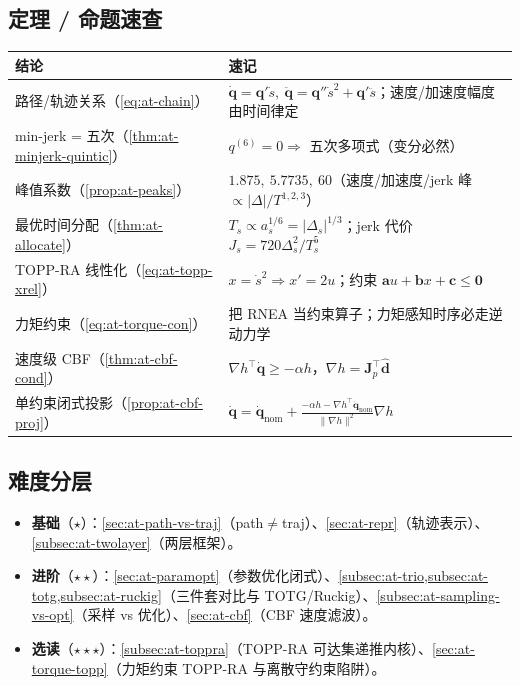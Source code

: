 \subsection*{定理 / 命题速查}
\begin{longtable}{p{} p{}}
\toprule
结论 & 速记 \\
\midrule
\endhead
路径/轨迹关系（\cref{eq:at-chain}） & $\dot{\mathbf{q}}=\mathbf{q}'\dot s,\ \ddot{\mathbf{q}}=\mathbf{q}''\dot s^2+\mathbf{q}'\ddot s$；速度/加速度幅度由时间律定 \\
min-jerk = 五次（\cref{thm:at-minjerk-quintic}） & $q^{(6)}=0\Rightarrow$ 五次多项式（变分必然） \\
峰值系数（\cref{prop:at-peaks}） & $1.875,\ 5.7735,\ 60$（速度/加速度/jerk 峰 $\propto|\Delta|/T^{1,2,3}$） \\
最优时间分配（\cref{thm:at-allocate}） & $T_s\propto a_s^{1/6}=|\Delta_s|^{1/3}$；jerk 代价 $J_s=720\Delta_s^2/T_s^5$ \\
TOPP-RA 线性化（\cref{eq:at-topp-xrel}） & $x=\dot s^2\Rightarrow x'=2u$；约束 $\mathbf{a}u+\mathbf{b}x+\mathbf{c}\le\mathbf{0}$ \\
力矩约束（\cref{eq:at-torque-con}） & 把 RNEA 当约束算子；力矩感知时序必走逆动力学 \\
速度级 CBF（\cref{thm:at-cbf-cond}） & $\nabla h^\top\dot{\mathbf{q}}\ge-\alpha h$，$\nabla h=\mathbf{J}_p^\top\hat{\mathbf{d}}$ \\
单约束闭式投影（\cref{prop:at-cbf-proj}） & $\dot{\mathbf{q}}=\dot{\mathbf{q}}_{\mathrm{nom}}+\frac{-\alpha h-\nabla h^\top\dot{\mathbf{q}}_{\mathrm{nom}}}{\|\nabla h\|^2}\nabla h$ \\
\bottomrule
\end{longtable}

\subsection*{难度分层}
\begin{itemize}
  \item \textbf{基础}（$\star$）：\cref{sec:at-path-vs-traj}（path$\ne$traj）、\cref{sec:at-repr}（轨迹表示）、\cref{subsec:at-twolayer}（两层框架）。
  \item \textbf{进阶}（$\star\star$）：\cref{sec:at-paramopt}（参数优化闭式）、\cref{subsec:at-trio,subsec:at-totg,subsec:at-ruckig}（三件套对比与 TOTG/Ruckig）、\cref{subsec:at-sampling-vs-opt}（采样 vs 优化）、\cref{sec:at-cbf}（CBF 速度滤波）。
  \item \textbf{选读}（$\star\star\star$）：\cref{subsec:at-toppra}（TOPP-RA 可达集递推内核）、\cref{sec:at-torque-topp}（力矩约束 TOPP-RA 与离散守约束陷阱）。
\end{itemize}

